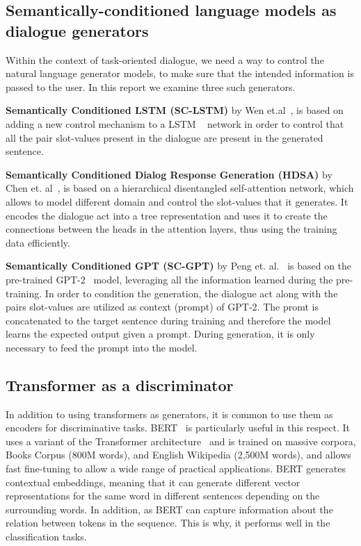\documentclass[11pt]{article}
\begin{document}
\subsection{Semantically-conditioned language models as dialogue generators}\label{conditioned-generators}
Within the context of task-oriented dialogue, we need a way to control the natural language generator models, to make sure that the intended information is passed to the user. In this report we examine three such generators.

\textbf{Semantically Conditioned LSTM (SC-LSTM)} by Wen et.al~\cite{wen-etal-2015-semantically},  is based on adding a new control mechanism to a LSTM ~\cite{hochreiter1997long} network in order to control that all the pair slot-values present in the dialogue are present in the generated sentence.

\textbf{Semantically Conditioned Dialog Response Generation (HDSA)} by Chen et. al~\cite{chen2019semantically},  is based on a  hierarchical disentangled self-attention network, which allows to model different domain and control the slot-values that it generates. It encodes the dialogue act into a tree representation and uses it to create the connections between the heads in the attention layers, thus using the training data efficiently.

\textbf{Semantically Conditioned GPT (SC-GPT)} by Peng et. al.~\cite{peng2020fewshot} is based on the pre-trained  GPT-2~\cite{radford2019language} model, leveraging all the information learned during the pre-training. In order to condition the generation, the dialogue act along with the pairs slot-values are utilized as context (prompt) of GPT-2. The promt is concatenated to the target sentence during training and therefore the model learns the expected output given a prompt. During generation, it is only necessary to feed the prompt into the model.


\subsection{Transformer as a discriminator}\label{discriminator}

In addition to using transformers as generators, it is common to use them as encoders for discriminative tasks. BERT~\cite{devlin2018bert} is particularly useful in this respect. It uses a variant of the Transformer  architecture~\cite{vaswani2017attention} and is trained on massive corpora, Books Corpus (800M words), and English Wikipedia (2,500M words), and allows fast fine-tuning to allow a wide range of practical applications. BERT generates contextual embeddings, meaning that it can generate different vector representations for the same word in different sentences depending on the surrounding words. In addition, as BERT can capture information about the relation between tokens in the sequence. This is why, it performs well in the classification tasks.
\end{document}
